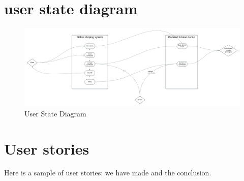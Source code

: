\documentclass{article}
\begin{document}
\section{user state diagram}

\begin{figure}[H]
    \centering
    \includegraphics[width=1.25\textwidth]{images/user_state_diagram.png}
    \caption{User State Diagram}
    \label{fig:user_state_diagram}
\end{figure}

\section{User stories}

Here is a sample of user stories: we have made and the conclusion.
\end{document}
